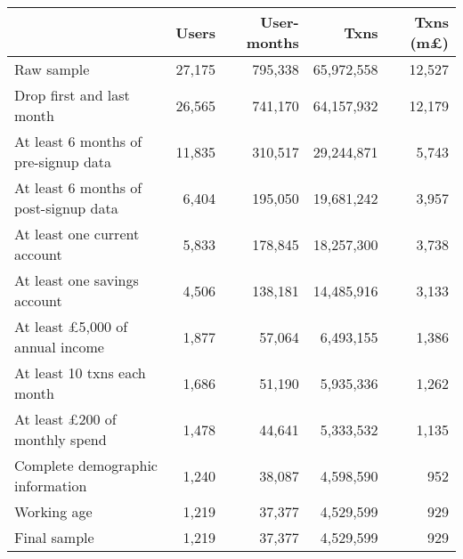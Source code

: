 \begin{tabular}{lrrrr}
\toprule
                                       &  Users & User-months &       Txns & Txns (m\pounds) \\
\midrule
                            Raw sample & 27,175 &     795,338 & 65,972,558 &          12,527 \\
             Drop first and last month & 26,565 &     741,170 & 64,157,932 &          12,179 \\
  At least 6 months of pre-signup data & 11,835 &     310,517 & 29,244,871 &           5,743 \\
 At least 6 months of post-signup data &  6,404 &     195,050 & 19,681,242 &           3,957 \\
          At least one current account &  5,833 &     178,845 & 18,257,300 &           3,738 \\
          At least one savings account &  4,506 &     138,181 & 14,485,916 &           3,133 \\
At least \pounds5,000 of annual income &  1,877 &      57,064 &  6,493,155 &           1,386 \\
           At least 10 txns each month &  1,686 &      51,190 &  5,935,336 &           1,262 \\
  At least \pounds200 of monthly spend &  1,478 &      44,641 &  5,333,532 &           1,135 \\
      Complete demographic information &  1,240 &      38,087 &  4,598,590 &             952 \\
                           Working age &  1,219 &      37,377 &  4,529,599 &             929 \\
                          Final sample &  1,219 &      37,377 &  4,529,599 &             929 \\
\bottomrule
\end{tabular}
